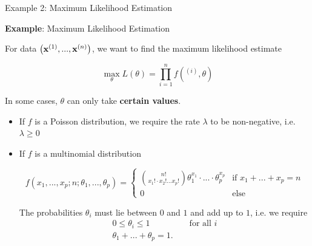 \begin{vbframe}{Example 2: Maximum Likelihood Estimation}

\textbf{Example}: Maximum Likelihood Estimation

\lz

For data $\left(\mathbf{x}^{(1)}, ..., \mathbf{x}^{(n)}\right)$, we want to find the maximum likelihood estimate

$$
\max_\theta L(\theta) = \prod_{i = 1}^n f(^{(i)}, \theta)
$$

In some cases, $\theta$ can only take \textbf{certain values}. 

\lz 

\begin{itemize}
\item If $f$ is a Poisson distribution, we require the rate $\lambda$ to be non-negative, i.e. $\lambda \ge 0$

  \item If $f$ is a multinomial distribution

\begin{footnotesize}
  $$
  f(x_1, ..., x_p; n; \theta_1, ..., \theta_p) = \begin{cases} \binom{n!}{x_1! \cdot x_2! ... x_p!} \theta_1^{x_1} \cdot ... \cdot \theta_p^{x_p} & \text{if } x_1 + ... + x_p = n \\ 0 & \text{else}
  \end{cases}
  $$
\end{footnotesize}

The probabilities $\theta_i$ must lie between $0$ and $1$ and add up to $1$, i.e. we require 
\begin{eqnarray*}
	0 \le \theta_i \le 1 && \text{ for all } i \\
	 \theta_1 + ... + \theta_p = 1. &&
\end{eqnarray*}

\end{itemize}

\end{vbframe}

